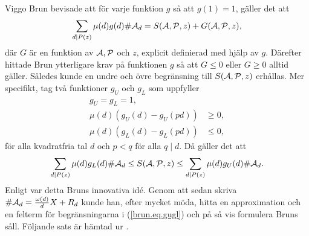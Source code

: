 Viggo Brun bevisade att för varje funktion $g$ så att $g(1)=1$, gäller det att
\begin{equation*}
    \sum_{d \mid P(z)} \mu(d) g(d) \card\A_d = \S{A}{P}{z} + G(\A,\P,z),
\end{equation*} %
där $G$ är en funktion av $\A,\P$ och $z$, explicit definierad med hjälp av $g$.
Därefter hittade Brun ytterligare krav på funktionen $g$ så att $G\leq0$ eller $G\geq0$ alltid gäller. 
Således kunde en undre och övre begränsning till $\S{A}{P}{z}$ erhållas.
Mer specifikt, tag två funktioner $g_U$ och $g_L$ som uppfyller
\begin{align*}
    g_U=g_L=1,\\
    \mu(d)(g_U(d)-g_U(pd)) &\geq 0,\\
    \mu(d)(g_L(d)-g_L(pd)) &\leq 0,
\end{align*}
för alla kvadratfria tal $d$ och $p<q$ för alla $q\mid d$. Då gäller det att
\begin{equation}\label{brun.eq.gugl}
    \sum_{d \mid P(z)} \mu(d) g_L(d) \card\A_d 
    \leq \S{A}{P}{z} 
    \leq \sum_{d \mid P(z)} \mu(d) g_U(d) \card\A_d.
\end{equation}
Enligt \cite{cojocarumurty} var detta Bruns innovativa idé. %
Genom att sedan skriva $\card\A_d=\frac{\omega(d)}{d}X + R_d$ kunde han, efter mycket möda, hitta en approximation och en felterm för begränsningarna i (\ref{brun.eq.gugl}) och på så vis formulera Bruns såll. Följande sats är hämtad ur \cite[Kap. 6.2]{cojocarumurty}.


